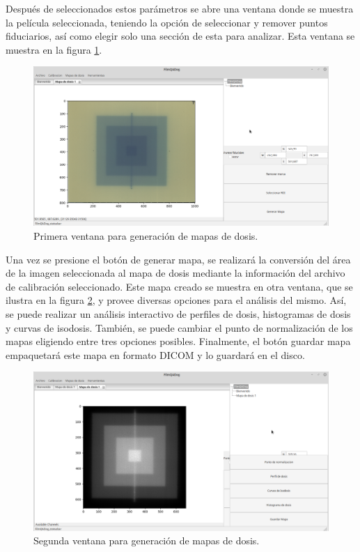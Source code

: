 Después de seleccionados estos parámetros se abre una ventana donde se muestra la película seleccionada, teniendo la opción de seleccionar y remover puntos fiduciarios, así como elegir solo una sección de esta para analizar. Esta ventana se muestra en la figura \ref{fig:ventanaMapaDosis1}.\\
\begin{figure}[H]
	\centering
	\includegraphics[width=0.7\linewidth]{images/imagenesDocumentacion/ventanaMapaDosis.png}
	\caption{Primera ventana para generación de mapas de dosis. }
	\label{fig:ventanaMapaDosis1}
\end{figure}

Una vez se presione el botón de generar mapa, se realizará la conversión del área de la imagen seleccionada al mapa de dosis mediante la información del archivo de calibración seleccionado. Este mapa creado se muestra en otra ventana, que se ilustra en la figura \ref{fig:ventanaMapaDosis2}, y provee diversas opciones para el análisis del mismo. Así, se puede realizar un análisis interactivo de perfiles de dosis, histogramas de dosis y curvas de isodosis. También, se puede cambiar el punto de normalización de los mapas eligiendo entre tres opciones posibles. Finalmente, el botón guardar mapa empaquetará este mapa en formato DICOM y lo guardará en el disco.\\

\begin{figure}[H]
	\centering
	\includegraphics[width=0.7\linewidth]{images/imagenesDocumentacion/ventanaMapaDosis2.png}
	\caption{Segunda ventana para generación de mapas de dosis. }
	\label{fig:ventanaMapaDosis2}
\end{figure}

